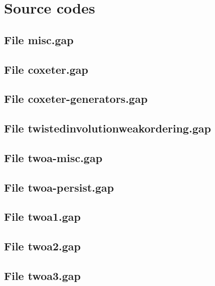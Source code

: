 \section{Source codes}
\label{sec:sourcecodes}

\subsection*{File misc.gap}
\label{file:misc}


\subsection*{File coxeter.gap}
\label{file:coxeter}


\subsection*{File coxeter-generators.gap}
\label{file:coxeter-generators}


\subsection*{File twistedinvolutionweakordering.gap}
\label{file:twistedinvolutionweakordering}


\subsection*{File twoa-misc.gap}
\label{file:twoa-misc}


\subsection*{File twoa-persist.gap}
\label{file:twoa-persist}


\subsection*{File twoa1.gap}
\label{file:twoa1}


\subsection*{File twoa2.gap}
\label{file:twoa2}


\subsection*{File twoa3.gap}
\label{file:twoa3}
